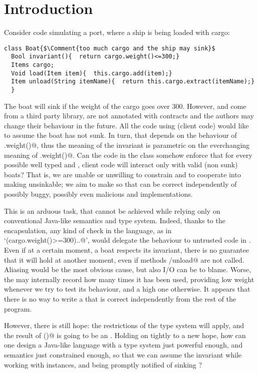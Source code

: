 \saveSpace\saveSpace
\section{Introduction}
\saveSpace
Consider code simulating a port, where a ship is being loaded with cargo:
\saveSpace
\begin{lstlisting}
class Boat{$\Comment{too much cargo and the ship may sink}$
  Bool invariant(){  return cargo.weight()<=300;}
  Items cargo;
  Void load(Item item){  this.cargo.add(item);}
  Item unload(String itemName){  return this.cargo.extract(itemName);}
  }
\end{lstlisting}
\saveSpace

The boat will sink if the weight of the cargo goes over 300.
However, 
\Q@Item@ and \Q@Items@ come from a third party library,  are not annotated with contracts and the authors may change their behaviour in the future.
All the code using \Q@Boat@  (client code) would like to 
assume the boat has not sunk.
In turn, that depends on the behaviour of \Q@Items.weight()@, thus the meaning of the \Q@Boat@ invariant is parametric on the everchanging meaning of  \Q@Items.weight()@.
Can the code in the \Q@Boat@ class somehow enforce that for every possible well typed \Q@Item@ and \Q@Items@, client code will interact only with valid (non sunk)  boats?
That is, we are unable or unwilling to constrain \Q@Item@ and \Q@Items@ to
cooperate into making \Q@Boat@s unsinkable; we aim
to make so that \Q@Boat@s can be correct independently of
possibly buggy, possibly even malicious \Q@Item@ and \Q@Items@ implementations.

This is an arduous task, that cannot be achieved while relying only on conventional Java-like semantics and type system.
Indeed, thanks to the encapsulation, any kind of check in the language,
as in `\Q@if(cargo.weight()>=300){..}@', would delegate the 
behaviour to untrusted code in \Q@Items@.
Even if at a certain moment, a boat respects its
invariant, there is no guarantee that
it will hold at another moment,
even if methods \Q@load/unload@ are not called.
Aliasing would be the most obvious cause, but also I/O can be to blame.
Worse, the \Q@cargo@ may internally record how many times
it has been used, providing low weight whenever we try to test its behaviour, and a high one otherwise.
It appears that there is no way to write a \Q@Boat@
that is correct independently from the rest of the program.

However, there is still hope: the restrictions of the type system will apply,
and the result of \Q@weight()@ is going to be an \Q@Int@.
Holding on tightly to a new hope, how can one design a Java-like language with
a type system just powerful enough, and semantics just constrained enough, so that we can assume the \Q@Boat@ invariant while working with \Q@Boat@ instances, and being promptly notified of sinking \Q@Boat@s?

